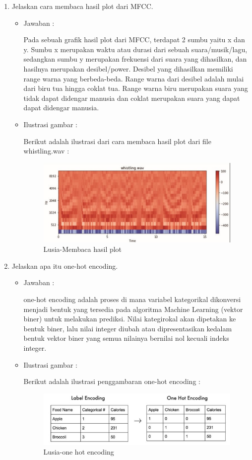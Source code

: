 \begin{enumerate}
\item Jelaskan cara membaca hasil plot dari MFCC.
	\begin{itemize}
	\item Jawaban :
		\par Pada sebuah grafik hasil plot dari MFCC, terdapat 2 sumbu yaitu x dan y. Sumbu x merupakan waktu atau durasi dari sebuah suara/musik/lagu, sedangkan sumbu y merupakan frekuensi dari suara yang dihasilkan, dan hasilnya merupakan desibel/power. Desibel yang dihasilkan memiliki range warna yang berbeda-beda. Range warna dari desibel adalah mulai dari biru tua hingga coklat tua. Range warna biru merupakan suara yang tidak dapat didengar manusia dan coklat merupakan suara yang dapat dapat didengar manusia.
	\item Ilustrasi gambar :
		\par Berikut adalah ilustrasi dari cara membaca hasil plot dari file whistling.wav :
		\begin{figure}[!hbtp]
		\centering
		\includegraphics[scale=0.5]{figures/s5.jpg}
		\caption{Lusia-Membaca hasil plot}
		\label{6A5}
		\end{figure}
		
	\end{itemize}
\item Jelaskan apa itu one-hot encoding.
	\begin{itemize}
	\item Jawaban :
		\par one-hot encoding adalah proses di mana variabel kategorikal dikonversi menjadi bentuk yang tersedia pada algoritma Machine Learning (vektor biner) untuk melakukan prediksi. Nilai kategirokal akan dipetakan ke bentuk biner, lalu nilai integer diubah atau dipresentasikan kedalam bentuk vektor biner yang semua nilainya bernilai nol kecuali indeks integer.
	\item Ilustrasi gambar :
		\par Berikut adalah ilustrasi penggambaran one-hot encoding :
		\begin{figure}[!hbtp]
		\centering
		\includegraphics[scale=0.4]{figures/s6.jpg}
		\caption{Lusia-one hot encoding}
		\label{6A6}
		\end{figure}
	\end{itemize}
	

\end{enumerate}
